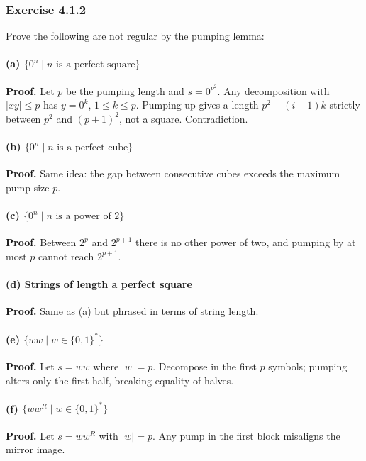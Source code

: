 \documentclass{article}
\theoremstyle{theorem}
\theoremstyle{definition}
\theoremstyle{remark}
\begin{document}
\subsubsection*{Exercise 4.1.2}
Prove the following are not regular by the pumping lemma:

\paragraph{(a) \(\{0^n\mid n\text{ is a perfect square}\}\)}
\textbf{Proof.} Let \(p\) be the pumping length and \(s=0^{p^2}\). Any decomposition with \(\lvert xy\rvert\le p\) has \(y=0^k\), \(1\le k\le p\). Pumping up gives a length \(p^2 + (i-1)k\) strictly between \(p^2\) and \((p+1)^2\), not a square. Contradiction.

\paragraph{(b) \(\{0^n\mid n\text{ is a perfect cube}\}\)}
\textbf{Proof.} Same idea: the gap between consecutive cubes exceeds the maximum pump size \(p\).

\paragraph{(c) \(\{0^n\mid n\text{ is a power of 2}\}\)}
\textbf{Proof.} Between \(2^p\) and \(2^{p+1}\) there is no other power of two, and pumping by at most \(p\) cannot reach \(2^{p+1}\).

\paragraph{(d) Strings of length a perfect square}
\textbf{Proof.} Same as (a) but phrased in terms of string length.

\paragraph{(e) \(\{ww\mid w\in\{0,1\}^*\}\)}
\textbf{Proof.} Let \(s=ww\) where \(\lvert w\rvert=p\). Decompose in the first \(p\) symbols; pumping alters only the first half, breaking equality of halves.

\paragraph{(f) \(\{ww^R\mid w\in\{0,1\}^*\}\)}
\textbf{Proof.} Let \(s= w w^R\) with \(\lvert w\rvert=p\). Any pump in the first block misaligns the mirror image.
\end{document}
